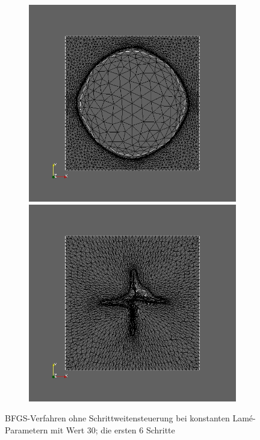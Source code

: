 \begin{figure}
\begin{subfigure}{0.3\textwidth}
	\caption{}	
	\end{subfigure}
	\begin{subfigure}{0.3\textwidth}
	\centering
	\includegraphics[scale=0.2]{pic_bigcircle_constlame5.jpg}
	\caption{}	
	\centering
	\includegraphics[scale=0.2]{pic_bigcircle_constlame6.jpg}
	\caption{}	
	\end{subfigure}
\caption{BFGS-Verfahren ohne Schrittweitensteuerung bei konstanten Lamé-Parametern mit Wert 30; die ersten 6 Schritte}
\label{Destroyedkonstlame}
\end{figure}

